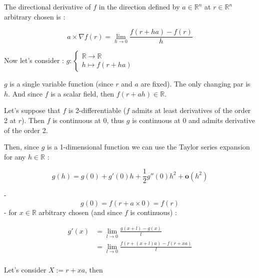 \documentclass[12pt]{article}
\begin{document}
The directional derivative of $f$ in the direction defined by $a \in \mathbb{R}^n$ at $r \in \mathbb{R}^n$ arbitrary chosen is :

$$
a \times \nabla f(r) = \lim_{h \rightarrow 0} \frac{f(r+ha)-f(r)}{h}
$$

Now let's consider :
$
g : \begin{cases}
\mathbb{R} \rightarrow \mathbb{R} \\
h \mapsto f(r+ha)
\end{cases}
$

$g$ is a single variable function (since $r$ and $a$ are fixed). The only changing par is $h$. And since $f$ is a scalar field, then $f(r+ah) \in \mathbb{R}$.

Let's suppose that $f$ is 2-differentiable ($f$ admits at least derivatives of the order 2 at $r$). Then $f$ is continuous at $0$, thus $g$ is continuous at $0$ and admits derivative of the order 2.

Then, since $g$ is a 1-dimensional function we can use the Taylor series expansion for any $h \in \mathbb{R}$ :

$$
g(h) = g(0) + g'(0)h + \frac{1}{2}g''(0)h^2 + \mathbf{o}(h^2)
$$

- 
$$
g(0) = f(r+a \times 0) = f(r)
$$
- for $x \in \mathbb{R}$ arbitrary chosen (and since $f$ is continuous) :

\begin{equation*}
    \begin{split}
        g'(x) &= \lim_{l \rightarrow 0} \frac{g(x+l)-g(x)}{l} \\
        &=  \lim_{l \rightarrow 0} \frac{f(r+(x+l)a)-f(r+xa)}{l} \\
    \end{split}
\end{equation*}

Let's consider $X := r+xa$, then
\end{document}
